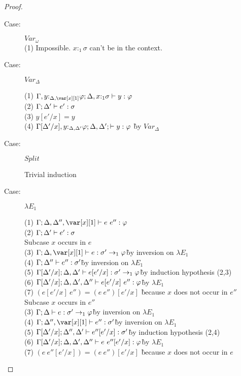 \begin{proof}
\begin{description}
\item[Case:] $Var_\omega$\\
  (1) Impossible. $x{:}_1\sigma$ can't be in the context.\\

\item[Case:] $Var_\Delta$
\begin{tabbing}
  (1) $\G,y{:}_{\Delta,\xl}\varphi; \D, x{:}_1\sigma \vdash y : \varphi$\\
  (2) $\Gamma; \Delta' \vdash e' : \sigma$\\
  (3) $y[e'/x] = y$\\
  (4) $\Gamma[\Delta'/x],y{:}_{\Delta,\Delta'}\varphi; \Delta,\Delta'; \vdash y : \varphi$ \` by $Var_\Delta$\\
\end{tabbing}

\item[Case:] $Split$
\begin{tabbing}
    Trivial induction
\end{tabbing}

\item[Case:] $\lambda E_1$
\begin{tabbing}
  (1) $\G; \D,\D'',\xl \vdash e~e'' : \vp$\\
  (2) $\Gamma; \Delta' \vdash e' : \sigma$\\
  Subcase $x$ occurs in $e$\\
  (3) $\G; \D,\xl \vdash e : \s' \to_1 \vp$\` by inversion on $\lambda E_1$\\
  (4) $\Gamma; \Delta'' \vdash e'' : \sigma'$\` by inversion on $\lambda E_1$\\
  (5) $\Gamma[\Delta'/x]; \Delta, \Delta' \vdash e[e'/x] : \sigma' \to_1 \varphi$\` by induction hypothesis (2,3)\\
  (6) $\Gamma[\Delta'/x]; \Delta, \Delta', \Delta'' \vdash e[e'/x]~e'' : \varphi$\` by $\lambda E_1$\\
  (7) $(e[e'/x]~e'') = (e~e'')[e'/x]$ \` because $x$ does not occur in $e''$\\
  Subcase $x$ occurs in $e''$\\
  (3) $\Gamma; \Delta \vdash e : \sigma' \to_1 \varphi$\` by inversion on $\lambda E_1$\\
  (4) $\G; \D'', \xl \vdash e'' : \s'$\` by inversion on $\lambda E_1$\\
  (5) $\Gamma[\Delta'/x]; \Delta'',\Delta' \vdash e''[e'/x] : \sigma'$\` by induction hypothesis (2,4)\\
  (6) $\Gamma[\Delta'/x]; \Delta,\Delta',\Delta'' \vdash e~e''[e'/x] : \varphi$\` by $\lambda E_1$\\
  (7) $(e~e''[e'/x]) = (e~e'')[e'/x]$ \` because $x$ does not occur in $e$\\
\end{tabbing}


\end{description}
\end{proof}
